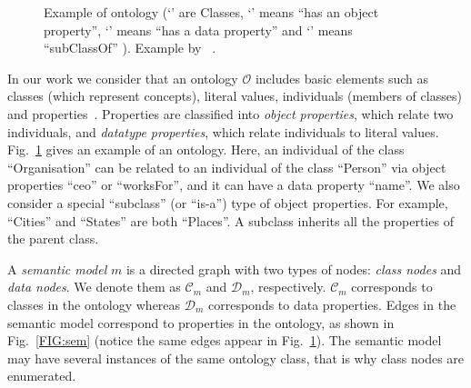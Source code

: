 \documentclass[letterpaper]{article} %
\newcommand{\citeasnoun}[1]{\citeauthor{#1}~\shortcite{#1}}
\begin{document}
\begin{figure}[ht]
\caption{Example of ontology
(`\protect{}' are Classes, `\protect{}' means ``has an object property'', 
`\protect{}' 
means ``has a data property'' and 
`\protect{}' means ``subClassOf'' ). Example by
\protect\citeasnoun{Taheriyan2013}.
}
\label{FIG:onto}
\vspace{-3mm}
\end{figure}

In our work we consider that an ontology $\mathcal{O}$ includes basic elements such 
as classes (which represent concepts), literal values, individuals (members of classes) and properties~\cite{Spanos:semweb}.
Properties are classified into \emph{object properties}, which relate two 
individuals, 
and \emph{datatype properties}, which relate individuals to literal values.
Fig.~\ref{FIG:onto} gives an example of an ontology. 
Here, an individual of the class ``Organisation'' can be related to an individual of the class ``Person'' via object properties ``ceo'' or ``worksFor'', and it can have a data property ``name''. 
We also consider a special ``subclass'' (or ``is-a'') type of object properties.
For 
example, ``Cities'' and ``States'' are both ``Places''. 
A subclass inherits all the properties of the parent class.

A \emph{semantic model} $m$ is a directed graph with two types of nodes: 
\emph{class nodes} and \emph{data nodes}. 
We denote them as $\mathcal{C}_m$ and $\mathcal{D}_m$, respectively.
$ \mathcal{C}_m$ corresponds to classes in the ontology 
whereas $\mathcal{D}_m$ corresponds to data 
properties. 
Edges in the semantic model correspond to properties in the ontology, as 
shown in Fig.~\ref{FIG:sem} (notice the same edges appear in Fig.~\ref{FIG:onto}).
The semantic model may have several instances of the same ontology class, that is why class nodes are enumerated.
\end{document}
